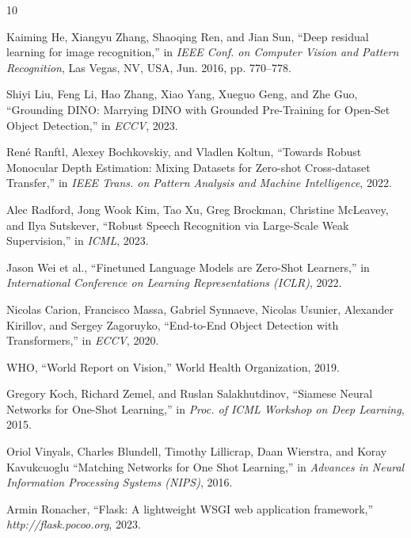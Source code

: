 \documentclass{article}
\begin{document}

\begin{thebibliography}{10}

Kaiming He, Xiangyu Zhang, Shaoqing Ren, and Jian Sun,
``Deep residual learning for image recognition,''
in \textit{IEEE Conf. on Computer Vision and Pattern Recognition},
Las Vegas, NV, USA, Jun. 2016, pp. 770--778.

Shiyi Liu, Feng Li, Hao Zhang, Xiao Yang, Xueguo Geng, and Zhe Guo,
``Grounding DINO: Marrying DINO with Grounded Pre-Training for Open-Set Object Detection,''
in \textit{ECCV}, 2023.

Ren\'e Ranftl, Alexey Bochkovskiy, and Vladlen Koltun,
``Towards Robust Monocular Depth Estimation: Mixing Datasets for Zero-shot Cross-dataset Transfer,''
in \textit{IEEE Trans. on Pattern Analysis and Machine Intelligence}, 2022.

Alec Radford, Jong Wook Kim, Tao Xu, Greg Brockman, Christine McLeavey, and Ilya Sutskever,
``Robust Speech Recognition via Large-Scale Weak Supervision,''
in \textit{ICML}, 2023.

Jason Wei et al.,
``Finetuned Language Models are Zero-Shot Learners,''
in \textit{International Conference on Learning Representations (ICLR)}, 2022.

Nicolas Carion, Francisco Massa, Gabriel Synnaeve, Nicolas Usunier, Alexander Kirillov, and Sergey Zagoruyko,
``End-to-End Object Detection with Transformers,''
in \textit{ECCV}, 2020.

WHO,
``World Report on Vision,''
World Health Organization, 2019.

Gregory Koch, Richard Zemel, and Ruslan Salakhutdinov,
``Siamese Neural Networks for One-Shot Learning,''
in \textit{Proc. of ICML Workshop on Deep Learning}, 2015.

Oriol Vinyals, Charles Blundell, Timothy Lillicrap, Daan Wierstra, and Koray Kavukcuoglu
``Matching Networks for One Shot Learning,''
in \textit{Advances in Neural Information Processing Systems (NIPS)}, 2016.

Armin Ronacher,
``Flask: A lightweight WSGI web application framework,''
\textit{http://flask.pocoo.org}, 2023.

\end{thebibliography}
\end{document}
